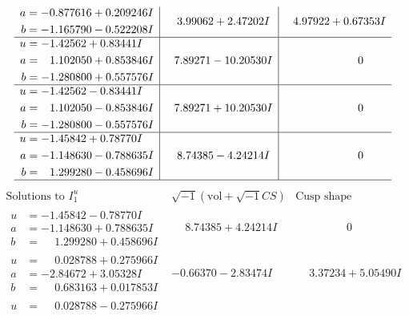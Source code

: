 \documentclass[1p]{elsarticle_modified}
\theoremstyle{definition}
\newcommand{\I}{\sqrt{-1}}
\begin{document}
$$\begin{array}{c|c|c}
\begin{aligned}
a &= -0.877616 + 0.209246 I \\
b &= -1.165790 - 0.522208 I\end{aligned}
 & \phantom{-}3.99062 + 2.47202 I & \phantom{-}4.97922 + 0.67353 I \\ \hline\begin{aligned}
u &= -1.42562 + 0.83441 I \\
a &= \phantom{-}1.102050 + 0.853846 I \\
b &= -1.280800 + 0.557576 I\end{aligned}
 & \phantom{-}7.89271 - 10.20530 I & \phantom{-0.000000 } 0 \\ \hline\begin{aligned}
u &= -1.42562 - 0.83441 I \\
a &= \phantom{-}1.102050 - 0.853846 I \\
b &= -1.280800 - 0.557576 I\end{aligned}
 & \phantom{-}7.89271 + 10.20530 I & \phantom{-0.000000 } 0 \\ \hline\begin{aligned}
u &= -1.45842 + 0.78770 I \\
a &= -1.148630 - 0.788635 I \\
b &= \phantom{-}1.299280 - 0.458696 I\end{aligned}
 & \phantom{-}8.74385 - 4.24214 I & \phantom{-0.000000 } 0\\
 \hline 
 \end{array}$$\newpage$$\begin{array}{c|c|c}  
\text{Solutions to }I^u_{1}& \I (\text{vol} + \sqrt{-1}CS) & \text{Cusp shape}\\
 \hline 
\begin{aligned}
u &= -1.45842 - 0.78770 I \\
a &= -1.148630 + 0.788635 I \\
b &= \phantom{-}1.299280 + 0.458696 I\end{aligned}
 & \phantom{-}8.74385 + 4.24214 I & \phantom{-0.000000 } 0 \\ \hline\begin{aligned}
u &= \phantom{-}0.028788 + 0.275966 I \\
a &= -2.84672 + 3.05328 I \\
b &= \phantom{-}0.683163 + 0.017853 I\end{aligned}
 & -0.66370 - 2.83474 I & \phantom{-}3.37234 + 5.05490 I \\ \hline\begin{aligned}
u &= \phantom{-}0.028788 - 0.275966 I \\

\end{aligned}
\end{array}$$
\end{document}

